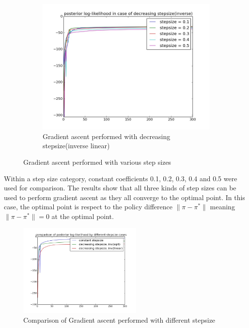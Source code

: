 \documentclass[10pt,a4paper]{article}
\begin{document}
\begin{figure}
\begin{subfigure}[b]{0.65\textwidth}
    \end{subfigure}
    \begin{subfigure}[b]{0.65\textwidth}
        \includegraphics[width=\textwidth]{figs/decreasing_stepsize_inv(linear).jpg}
        \caption{Gradient ascent performed with decreasing stepsize(inverse linear)}
    \end{subfigure}
    \caption{Gradient ascent performed with various step sizes}
    \label{fig:step_size}
\end{figure}

Within a step size category, constant coefficients 0.1, 0.2, 0.3, 0.4 and 0.5 were used for comparison. The results show that all three kinds of step sizes can be used to perform gradient ascent as they all converge to the optimal point. In this case, the optimal point is respect to the policy difference  $\| \pi - \pi^{*} \|$ meaning $\| \pi - \pi^{*} \| = 0$ at the optimal point. 

\begin{figure}
    \centering
        \includegraphics[width=0.55\textwidth]{figs/comparison_stepsize.jpg}
        \caption{Comparison of Gradient ascent performed with different stepsize}
        \label{fig:step_comparison}
\end{figure}
\end{document}
